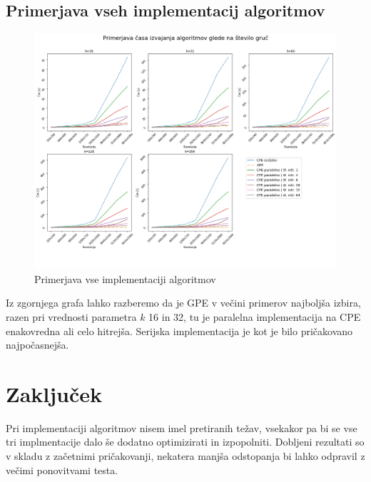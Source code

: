 \documentclass[11pt]{article}
\begin{document}
\subsection{Primerjava vseh implementacij algoritmov}
\begin{figure}[H]
    \label{img:comp}
    \centering
    \includegraphics[scale=0.28]{comp.png}
    \caption{Primerjava vse implementaciji algoritmov}
\end{figure}

Iz zgornjega grafa lahko razberemo da je GPE v večini primerov najboljša izbira, razen pri vrednosti parametra $k$ 16 in 32, tu je paralelna implementacija na CPE enakovredna ali celo hitrejša.
Serijska implementacija je kot je bilo pričakovano najpočasnejša.

\section{Zaključek}
Pri implementaciji algoritmov nisem imel pretiranih težav, vsekakor pa bi se vse tri implmentacije dalo še dodatno optimizirati in izpopolniti.
Dobljeni rezultati so v skladu z začetnimi pričakovanji, nekatera manjša odstopanja bi lahko odpravil z večimi ponovitvami testa.
\end{document}
